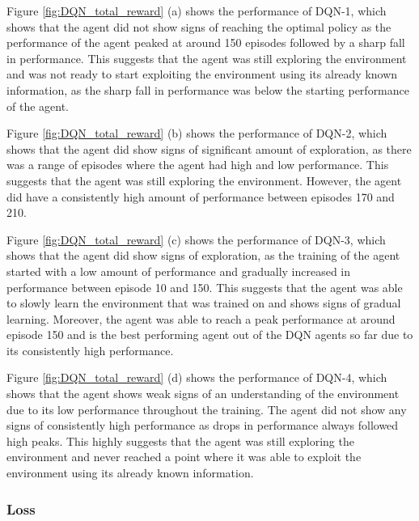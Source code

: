 Figure \ref{fig:DQN_total_reward} (a) shows the performance of DQN-1, which shows that the agent did not show signs of reaching the optimal policy as the performance of the agent peaked at around 150 episodes followed by a sharp fall in performance. This suggests that the agent was still exploring the environment and was not ready to start exploiting the environment using its already known information, as the sharp fall in performance was below the starting performance of the agent.

Figure \ref{fig:DQN_total_reward} (b) shows the performance of DQN-2, which shows that the agent did show signs of significant amount of exploration, as there was a range of episodes where the agent had high and low performance. This suggests that the agent was still exploring the environment. However, the agent did have a consistently high amount of performance between episodes 170 and 210.

Figure \ref{fig:DQN_total_reward} (c) shows the performance of DQN-3, which shows that the agent did show signs of exploration, as the training of the agent started with a low amount of performance and gradually increased in performance between episode 10 and 150. This suggests that the agent was able to slowly learn the environment that was trained on and shows signs of gradual learning. Moreover, the agent was able to reach a peak performance at around episode 150 and is the best performing agent out of the DQN agents so far due to its consistently high performance. 

Figure \ref{fig:DQN_total_reward} (d) shows the performance of DQN-4, which shows that the agent shows weak signs of an understanding of the environment due to its low performance throughout the training. The agent did not show any signs of consistently high performance as drops in performance always followed high peaks. This highly suggests that the agent was still exploring the environment and never reached a point where it was able to exploit the environment using its already known information.

\subsubsection{Loss}

